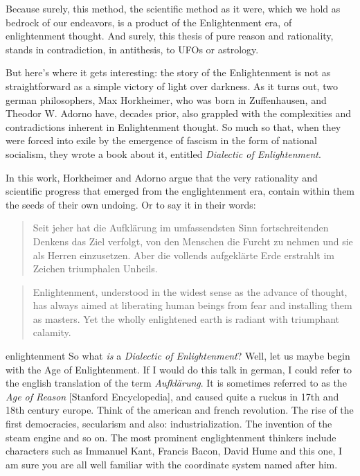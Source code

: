 
Because surely, this method, the scientific
method as it were, which we hold as bedrock of our endeavors,
is a product of the Enlightenment era, of enlightenment
thought. And surely, this thesis of pure reason and rationality, stands in
contradiction, in antithesis, to UFOs or astrology.

But here’s where it gets interesting: the story of the Enlightenment is not as
straightforward as a simple victory of light over darkness. 
As it turns out, two german philosophers, Max Horkheimer, who was born in
Zuffenhausen, and Theodor W. Adorno have, decades prior, also grappled with the complexities and
contradictions inherent in Enlightenment thought. So
much so that, when they were forced into exile by the emergence of fascism in
the form of national socialism, they wrote a book about it, entitled
\emph{Dialectic of Enlightenment}.

In this work, Horkheimer and Adorno argue that the very rationality and
scientific progress that emerged from the englightenment era, contain within
them the seeds of their own undoing. Or to say it in their words:
\blockquote{
  Seit jeher hat die Aufklärung im umfassendsten Sinn fortschreitenden Denkens
  das Ziel verfolgt, von den Menschen die Furcht zu nehmen und sie als Herren
  einzusetzen. Aber die vollends aufgeklärte Erde erstrahlt im Zeichen
  triumphalen Unheils.
}
\blockquote{
Enlightenment, understood in the widest sense as the advance of
thought, has always aimed at liberating human beings from fear and
installing them as masters. Yet the wholly enlightened earth is radiant with
triumphant calamity. 
}

\par{enlightenment}
So what \emph{is} a \emph{Dialectic of Enlightenment}? Well, let us maybe begin
with the Age of Enlightenment. If I would do this talk in german, I could refer
to the english translation of the term \emph{Aufklärung}. It is sometimes
referred to as the \emph{Age of Reason} [Stanford Encyclopedia], and caused
quite a ruckus in 17th and 18th century europe. Think of the american and
french revolution. The rise of the first democracies, secularism and also:
industrialization. The invention of the steam engine and so on.
The most prominent
englightenment thinkers include characters such as Immanuel Kant, Francis
Bacon, David Hume and this one, I am sure you are all well familiar with the
coordinate system named after him.

